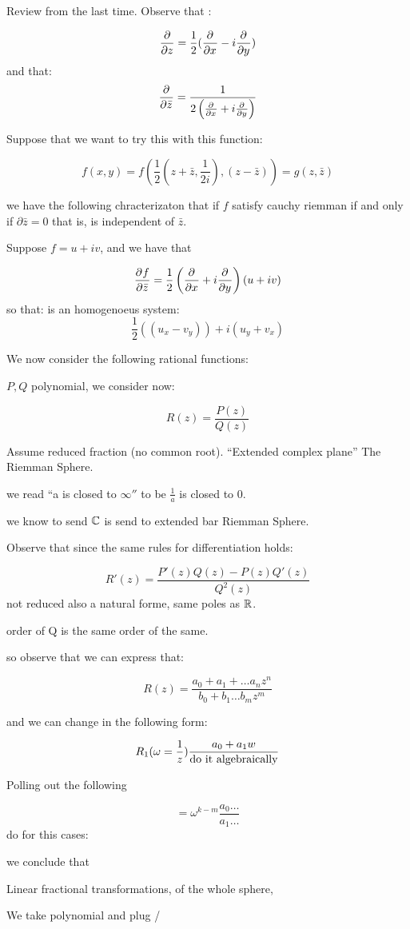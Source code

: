 Review from the last time.
Observe that :

\[ \frac{\partial }{\partial z} = \frac{1}{2}(\frac{\partial^{} }{\partial x^{}} - i\frac{\partial^{} }{\partial y^{}}) \]
and that:
\[ \frac{\partial^{} }{\partial \bar{z}^{}} = \frac{1}{2\left( \frac{\partial^{} }{\partial x^{}} + i \frac{\partial^{} }{\partial y^{}} \right)} \]

Suppose that we want to try this with this function:

\[ f(x,y) = f(\frac{1}{2}(z + \bar{z},\frac{1}{2i}),(z - \bar{z})) = g(z,\bar{z})\]

we have the following chracterizaton that if $f$ satisfy cauchy riemman if and only if $\partial \bar{z} = 0$ that is, is independent of $ \bar{z} $.

Suppose $f = u + iv$, and we have  that 

\[ \frac{\partial^{} f}{\partial \bar{z}^{}} = \frac{1}{2}\left( \frac{\partial^{} }{\partial x^{}} + i \frac{\partial^{} }{\partial y^{}} \right)(u+iv) \]
so that:
is an homogenoeus system:
\[ \frac{1}{2}((u_x - v_y)) + i(u_y + v_x) \]


We now consider the following rational functions:

$P,Q$ polynomial, we consider now:

\[ R(z) = \frac{P(z)}{Q(z)} \]

Assume reduced fraction (no common root).
``Extended complex plane''  The Riemman Sphere.

we read ``a is closed to $ \infty''$ to be $\frac{1}{a}$ is closed to $0$.

we know to send $\mathbb{C}$ is send to extended bar Riemman Sphere.

Observe that since the same rules for differentiation holds:

\[ R'(z) = \frac{P'(z)Q(z) - P(z)Q'(z)}{Q^2(z)} \]
not reduced also a natural forme, same poles as $\mathbb{R}$.

order of Q is the same order of the same.

so observe that we can express that:

\[ R(z) = \frac{a_0 + a_1 + \ldots a_n z^n}{b_0 + b_1 \ldots b_mz^m} \]

and we can change in the following form:

\[ R_1(\omega = \frac{1}{z})\frac{a_0 + a_1w}{\textrm{do it algebraically}} \]


Polling out the following

\[  = \omega^{k-m} \frac{a_0 \ldots}{a_1 \ldots }\]
do for this cases:

we conclude that 

Linear fractional transformations, of the whole sphere, 

We take polynomial and plug /